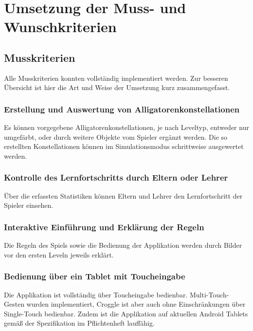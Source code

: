 \chapter{Umsetzung der Muss- und Wunschkriterien}


\section{Musskriterien}

Alle Musskriterien konnten vollständig implementiert werden. Zur besseren Übersicht ist hier die Art und Weise der Umsetzung kurz zusammengefasst.

\subsection{Erstellung und Auswertung von Alligatorenkonstellationen}

Es können vorgegebene Alligatorenkonstellationen, je nach Leveltyp, entweder nur umgefärbt, oder durch weitere Objekte vom Spieler ergänzt werden.
Die so erstellten Konstellationen können im Simulationsmodus schrittweise ausgewertet werden.

\subsection{Kontrolle des Lernfortschritts durch Eltern oder Lehrer}

Über die erfassten Statistiken können Eltern und Lehrer den Lernfortschritt der Spieler einsehen.

\subsection{Interaktive Einführung und Erklärung der Regeln}

Die Regeln des Spiels sowie die Bedienung der Applikation werden durch Bilder vor den ersten Leveln jeweils erklärt.

\subsection{Bedienung über ein Tablet mit Toucheingabe}

Die Applikation ist vollständig über Toucheingabe bedienbar. Multi-Touch-Gesten wurden implementiert, Croggle ist aber auch ohne Einschränkungen über Single-Touch bedienbar.
Zudem ist die Applikation auf aktuellen Android Tablets gemäß der Spezifikation im Pflichtenheft lauffähig.

